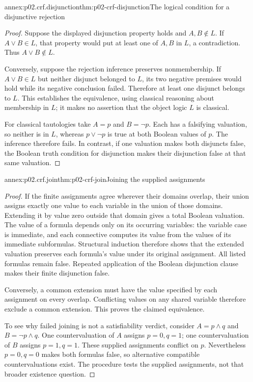 \begin{annexitem}{annex:p02.crf.disjunction}{thm:p02-crf-disjunction}{The logical condition for a disjunctive rejection}
\begin{proof}
Suppose the displayed disjunction property holds and \(A,B\notin L\).
If \(A\lor B\in L\), that property would put at least one of \(A,B\)
in \(L\), a contradiction. Thus \(A\lor B\notin L\).

Conversely, suppose the rejection inference preserves nonmembership.
If \(A\lor B\in L\) but neither disjunct belonged to \(L\), its two
negative premises would hold while its negative conclusion failed.
Therefore at least one disjunct belongs to \(L\). This establishes the
equivalence, using classical reasoning about membership in \(L\);
it makes no assertion that the object logic \(L\) is classical.

For classical tautologies take \(A=p\) and \(B=\neg p\).
Each has a falsifying valuation, so neither is in \(L\), whereas
\(p\lor\neg p\) is true at both Boolean values of \(p\).
The inference therefore fails. In contrast, if one valuation makes
both disjuncts false, the Boolean truth condition for disjunction
makes their disjunction false at that same valuation.
\end{proof}
\end{annexitem}

\begin{annexitem}{annex:p02.crf.join}{thm:p02-crf-join}{Joining the supplied assignments}
\begin{proof}
If the finite assignments agree wherever their domains overlap, their
union assigns exactly one value to each variable in the union of those
domains. Extending it by value zero outside that domain gives a total
Boolean valuation. The value of a formula depends only on its occurring
variables: the variable case is immediate, and each connective computes
its value from the values of its immediate subformulas. Structural
induction therefore shows that the extended valuation preserves each
formula's value under its original assignment. All listed formulas
remain false. Repeated application of the Boolean disjunction clause
makes their finite disjunction false.

Conversely, a common extension must have the value specified by each
assignment on every overlap. Conflicting values on any shared variable
therefore exclude a common extension. This proves the claimed equivalence.

To see why failed joining is not a satisfiability verdict, consider
\(A=p\land q\) and \(B=\neg p\land q\). One countervaluation of \(A\)
assigns \(p=0,q=1\); one countervaluation of \(B\) assigns \(p=1,q=1\).
These supplied assignments conflict on \(p\). Nevertheless \(p=0,q=0\)
makes both formulas false, so alternative compatible countervaluations
exist. The procedure tests the supplied assignments, not that broader
existence question.
\end{proof}
\end{annexitem}
